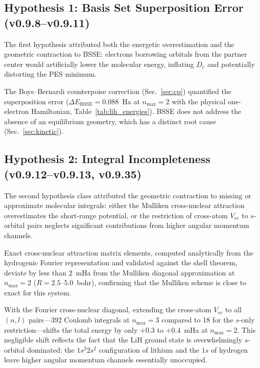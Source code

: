 \documentclass[aps,pra,twocolumn,superscriptaddress,longbibliography]{revtex4-2}
\begin{document}
\subsection{Hypothesis 1: Basis Set Superposition Error
(v0.9.8--v0.9.11)}
\label{sec:hyp_bsse}

The first hypothesis attributed both the energetic overestimation and
the geometric contraction to BSSE: electrons borrowing orbitals from the
partner center would artificially lower the molecular energy, inflating
$D_e$ and potentially distorting the PES minimum.

The Boys--Bernardi counterpoise correction (Sec.~\ref{sec:cp})
quantified the superposition error
($\Delta E_{\mathrm{BSSE}} = 0.088$~Ha at $n_{\max}=2$ with the
physical one-electron Hamiltonian, Table~\ref{tab:lih_energies}).
BSSE does not address the absence of an equilibrium geometry, which
has a distinct root cause (Sec.~\ref{sec:kinetic}).

\subsection{Hypothesis 2: Integral Incompleteness
(v0.9.12--v0.9.13, v0.9.35)}
\label{sec:hyp_integrals}

The second hypothesis class attributed the geometric contraction to
missing or approximate molecular integrals: either the Mulliken
cross-nuclear attraction overestimates the short-range potential, or the
restriction of cross-atom $V_{ee}$ to $s$-orbital pairs neglects
significant contributions from higher angular momentum channels.

Exact cross-nuclear attraction matrix elements, computed analytically
from the hydrogenic Fourier representation and validated against the
shell theorem, deviate by less than $2$~mHa from the Mulliken
diagonal approximation at $n_{\max}=2$ ($R=2.5$--$5.0$~bohr),
confirming that the Mulliken scheme is close to exact for this system.

With the Fourier cross-nuclear diagonal, extending the cross-atom
$V_{ee}$ to all $(n,l)$ pairs---392 Coulomb integrals at $n_{\max}=3$
compared to 18 for the $s$-only restriction---shifts the total energy
by only $+0.3$ to $+0.4$~mHa at $n_{\max}=2$.  This negligible shift reflects the fact that the LiH
ground state is overwhelmingly $s$-orbital dominated: the $1s^2 2s^2$
configuration of lithium and the $1s$ of hydrogen leave higher angular
momentum channels essentially unoccupied.
\end{document}
